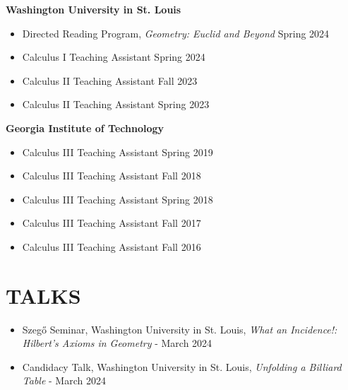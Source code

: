 \documentclass[a4paper,11pt]{extarticle}
\begin{document}
\textbf{Washington University in St. Louis}

\begin{itemize}
    \item Directed Reading Program, \emph{Geometry: Euclid and Beyond}
    \hfill Spring 2024
    \item Calculus I Teaching Assistant
    \hfill Spring 2024
    \item Calculus II Teaching Assistant \hfill Fall 2023
    \item Calculus II Teaching Assistant \hfill Spring 2023
\end{itemize}

\noindent
\textbf{Georgia Institute of Technology}

\begin{itemize}
    \item Calculus III Teaching Assistant \hfill Spring 2019
    \item Calculus III Teaching Assistant \hfill Fall 2018
    \item Calculus III Teaching Assistant \hfill Spring 2018
    \item Calculus III Teaching Assistant \hfill Fall 2017
    \item Calculus III Teaching Assistant \hfill Fall 2016
\end{itemize}

\section*{TALKS}
\begin{itemize}
    \item Szegő Seminar, Washington University in St. Louis, \emph{What an Incidence!: Hilbert's Axioms in Geometry} - March 2024
    \item Candidacy Talk, Washington University in St. Louis, \emph{Unfolding a Billiard Table} - March 2024
    
\end{itemize}


\end{document}
